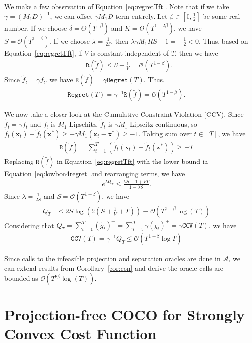 \documentclass[twoside,11pt,]{article}
\newcommand{\C}[1]{\mathcal{#1}}
\newcommand{\BF}[1]{\mathbf{#1}}
\newcommand{\x}{\BF{x}}
\newcommand{\xt}{\x_t}
\newcommand{\xs}{\x^*}
\newcommand{\tf}{\tilde{f}}
\newcommand{\tft}{\tilde{f}_t}
\newcommand{\tgt}{\tilde{g}_t}
\newcommand{\sumT}{\sum\limits_{t=1}^T}
\begin{document}
We make a few observation of Equation~\eqref{eq:regretTft}.
Note that if we take $\gamma=(M_1D)^{-1}$, we can offset $\gamma M_1 D$ term entirely.  
Let $\beta\in[0,\frac{1}{2}]$ be some real number.
If we choose $\delta=\Theta(T^{-\beta})$ and $K=\Theta(T^{1-2\beta})$, we have $S = \C{O}(T^{1-\beta})$.
If we choose $\lambda=\frac{1}{2S}$, then $\lambda \gamma M_1 R S -1 = -\frac{1}{2}<0$. 
Thus, based on Equation~\eqref{eq:regretTft}, if $V$ is constant independent of $T$, then we have
\begin{align}
    &\mathtt{R}(\tf) \leq S+\frac{1}{V} = \C{O}(T^{1-\beta}).
\end{align}
Since $\tft=\gamma f_t$, we have $\mathtt{R}(\tf) = \gamma\mathtt{Regret}(T)$. Thus,
\begin{align*}
    \mathtt{Regret}(T) = \gamma^{-1} \mathtt{R}(\tf) = \C{O}(T^{1-\beta}).
\end{align*}

We now take a closer look at the  Cumulative Constraint Violation (CCV). Since $\tft=\gamma f_t$ and $f_t$ is $M_1$-Lipschitz, $\tft$ is $\gamma M_1$-Lipscitz continuous, so $\tft(\xt)-\tft(\xs) \geq -\gamma M_1 (\xt-\xs) \geq -1$. Taking sum over $t\in[T]$, we have
\begin{align}
\label{eq:lowbon4regret}
    \mathtt{R}(\tf)=\sumT(\tft(\xt)-\tft(\xs)) \geq -T
\end{align}
Replacing $\mathtt{R}(\tf)$ in Equation~\eqref{eq:regretTft} with the lower bound in Equation~\eqref{eq:lowbon4regret} and rearranging terms, we have
\begin{align*}
    e^{\lambda Q_T} \leq 
    \frac{VS + 1 + VT }{1-\lambda S}.
\end{align*}
Since $\lambda=\frac{1}{2S}$ and $S = \C{O}(T^{1-\beta})$, we have
\begin{align*}
Q_T &\leq 2S \log\left( 2(S + \frac{1}{V} + T)\right) 
= \C{O}(T^{1-\beta}\log(T))
\end{align*}
Considering that $Q_T=\sumT(\tgt)^+=\sumT\gamma(g_t)^+=\gamma \mathtt{CCV}(T)$, we have
\begin{align*}
    \mathtt{CCV}(T) = \gamma^{-1} Q_T \leq \C{O}(T^{1-\beta}\log T)
\end{align*}

Since calls to the infeasible projection and separation oracles are done in $\C{A}$, we can extend results from Corollary~\ref{cor:con} and derive the oracle calls are bounded as $\C{O}(T^{2\beta}\log(T))$.




\section{Projection-free COCO for Strongly Convex Cost Function}
\label{sec:strongly-convex}
\end{document}
